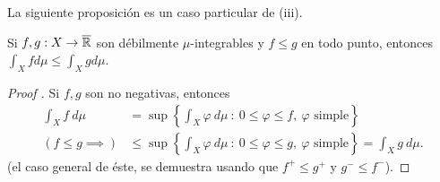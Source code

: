 \begin{note}
	La siguiente proposición es un caso particular de (iii).
\end{note}

\begin{prop}
	Si $f,g : X \to \overline{\mathbb{R}}$ son débilmente $\mu$-integrables y $f \leq g$ en todo punto, entonces $\int_{X} f d\mu \leq \int_{X} g d\mu$.
\end{prop}
\begin{proof}[Proof ]
	Si $f,g$ son no negativas, entonces
	\begin{align*}
		\int_{X} f \ d\mu &= \sup \left\{\int_{X} \varphi \ d\mu \ : \ 0 \leq \varphi \leq f,\ \varphi \text{ simple}\right\} \\
		(f \leq g \implies) &\leq \sup \left\{\int_{X} \varphi \ d\mu \ : \ 0 \leq \varphi \leq g,\ \varphi \text{ simple}\right\} = \int_{X} g \ d\mu.
	\end{align*}
	(el caso general de éste, se demuestra usando que $f^{+} \leq g^{+}$ y $g^{-} \leq f^{-}$).
\end{proof}

